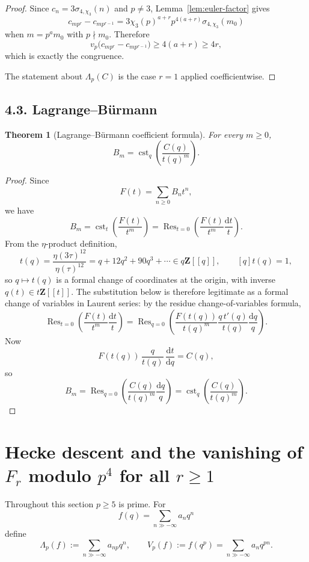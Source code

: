 \documentclass[11pt]{amsart}
\newtheorem{theorem}{Theorem}[section]
\theoremstyle{remark}
\DeclareMathOperator{\Res}{Res}
\DeclareMathOperator{\cst}{cst}
\newcommand{\Z}{\mathbf{Z}}
\newcommand{\dd}{\mathrm{d}}
\newcommand{\vp}{v_p}
\begin{document}
\begin{proof}
Since $c_n=3\sigma_{4,\chi_3}(n)$ and $p\neq3$, Lemma~\ref{lem:euler-factor} gives
\[
c_{mp^r}-c_{mp^{r-1}}=3\chi_3(p)^{a+r}p^{4(a+r)}\sigma_{4,\chi_3}(m_0)
\]
when $m=p^am_0$ with $p\nmid m_0$. Therefore
\[
\vp\bigl(c_{mp^r}-c_{mp^{r-1}}\bigr)\ge 4(a+r)\ge 4r,
\]
which is exactly the congruence.

The statement about $\Lambda_p(C)$ is the case $r=1$ applied coefficientwise.
\end{proof}

\subsection*{4.3. Lagrange--B\"urmann}

\begin{theorem}[Lagrange--B\"urmann coefficient formula]\label{thm:LB}
For every $m\ge0$,
\[
B_m=\cst_q\!\left(\frac{C(q)}{t(q)^m}\right).
\]
\end{theorem}

\begin{proof}
Since
\[
F(t)=\sum_{n\ge0}B_nt^n,
\]
we have
\[
B_m=\cst_t\!\left(\frac{F(t)}{t^m}\right)
=\Res_{t=0}\left(\frac{F(t)}{t^m}\frac{\dd t}{t}\right).
\]
From the $\eta$-product definition,
\[
t(q)=\frac{\eta(3\tau)^{12}}{\eta(\tau)^{12}}=q+12q^2+90q^3+\cdots\in q\Z[[q]],
\qquad [q]t(q)=1,
\]
so $q\mapsto t(q)$ is a formal change of coordinates at the origin, with inverse
$q(t)\in t\Z[[t]]$. The substitution below is therefore legitimate as a formal
change of variables in Laurent series: by the residue change-of-variables formula,
\[
\Res_{t=0}\left(\frac{F(t)}{t^m}\frac{\dd t}{t}\right)
=
\Res_{q=0}\left(
\frac{F(t(q))}{t(q)^m}\frac{q\,t'(q)}{t(q)}\frac{\dd q}{q}
\right).
\]
Now
\[
F(t(q))\,\frac{q}{t(q)}\,\frac{\dd t}{\dd q}=C(q),
\]
so
\[
B_m
=
\Res_{q=0}\left(\frac{C(q)}{t(q)^m}\frac{\dd q}{q}\right)
=
\cst_q\!\left(\frac{C(q)}{t(q)^m}\right).
\]
\end{proof}

\section{Hecke descent and the vanishing of $F_r$ modulo $p^4$ for all $r\ge1$}\label{sec:hecke-fricke}

Throughout this section $p\ge5$ is prime. For
\[
f(q)=\sum_{n\gg-\infty} a_n q^n
\]
define
\[
\Lambda_p(f):=\sum_{n\gg-\infty} a_{np}q^n,
\qquad
V_p(f):=f(q^p)=\sum_{n\gg-\infty} a_n q^{pn}.
\]
\end{document}
